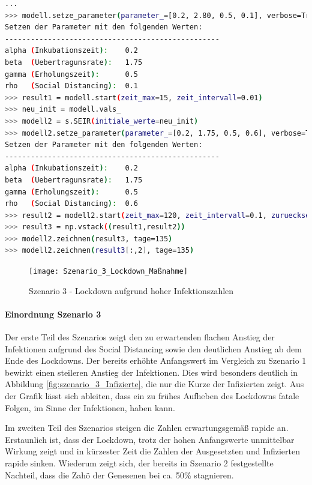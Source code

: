 \documentclass[12pt]{article}
\begin{document}
\begin{lstlisting}[language=Bash, caption=Szenario 3.1 - „Lockdown aufgrund hoher Infektionszahlen“, label=lst:Szenario3.1]
...
>>> modell.setze_parameter(parameter_=[0.2, 2.80, 0.5, 0.1], verbose=True)
Setzen der Parameter mit den folgenden Werten:
--------------------------------------------------
alpha (Inkubationszeit):    0.2
beta  (Uebertragunsrate):   1.75
gamma (Erholungszeit):      0.5
rho   (Social Distancing):  0.1
>>> result1 = modell.start(zeit_max=15, zeit_intervall=0.01)
>>> neu_init = modell.vals_
>>> modell2 = s.SEIR(initiale_werte=neu_init)
>>> modell2.setze_parameter(parameter_=[0.2, 1.75, 0.5, 0.6], verbose=True)
Setzen der Parameter mit den folgenden Werten:
--------------------------------------------------
alpha (Inkubationszeit):    0.2
beta  (Uebertragunsrate):   1.75
gamma (Erholungszeit):      0.5
rho   (Social Distancing):  0.6
>>> result2 = modell2.start(zeit_max=120, zeit_intervall=0.1, zuruecksetzen=False)
>>> result3 = np.vstack((result1,result2))
>>> modell2.zeichnen(result3, tage=135)
>>> modell2.zeichnen(result3[:,2], tage=135)
\end{lstlisting}

\begin{figure}[H]
\centering
\texttt{[image: Szenario\_3\_Lockdown\_Maßnahme]}
\caption{Szenario 3 - Lockdown aufgrund hoher Infektionszahlen}
\label{fig:szenario_3_1}
\end{figure}

\paragraph{Einordnung Szenario 3}
Der erste Teil des Szenarios zeigt den zu erwartenden flachen Anstieg der Infektionen aufgrund des Social Distancing sowie den deutlichen Anstieg ab dem Ende des Lockdowns. Der bereits erhöhte Anfangswert im Vergleich zu Szenario 1 bewirkt einen steileren Anstieg der Infektionen. Dies wird besonders deutlich in Abbildung \ref{fig:szenario_3_Infizierte}, die nur die Kurze der Infizierten zeigt. Aus der Grafik lässt sich ableiten, dass ein zu frühes Aufheben des Lockdowns fatale Folgen, im Sinne der Infektionen, haben kann.

Im zweiten Teil des Szenarios steigen die Zahlen erwartungsgemäß rapide an. Erstaunlich ist, dass der Lockdown, trotz der hohen Anfangswerte unmittelbar Wirkung zeigt und in kürzester Zeit die Zahlen der Ausgesetzten und Infizierten rapide sinken. Wiederum zeigt sich, der bereits in Szenario 2 festgestellte Nachteil, dass die Zahö der Genesenen bei ca. 50\% stagnieren.
\end{document}
